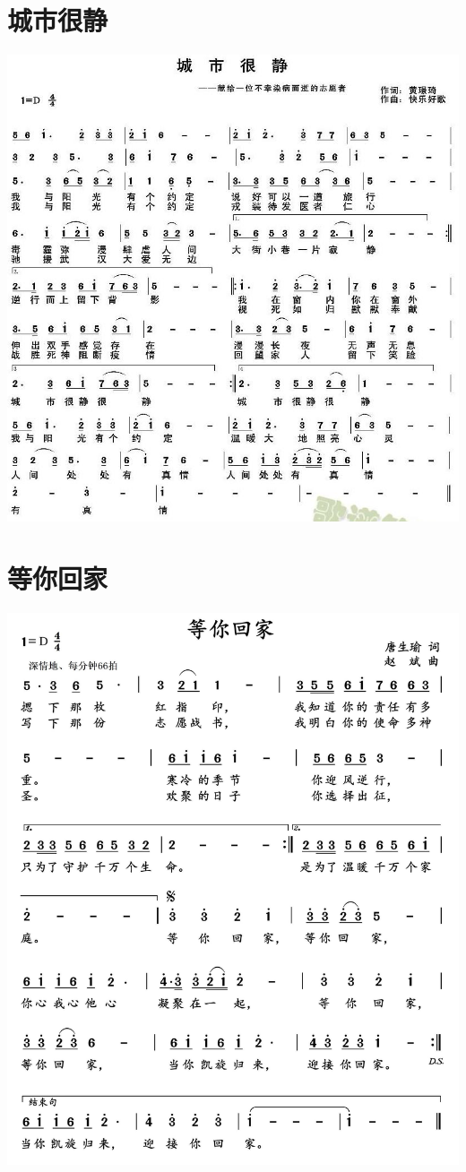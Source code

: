\documentclass[cn,pad,chinese,chinesefont=nofont]{elegantbook}
\begin{document}
\section{城市很静}
    \includegraphics[width=\textwidth]{dongxiao/20200402-城市很静} 
\section{等你回家}
    \includegraphics[width=\textwidth]{dongxiao/20200402-等你回家}
    
\end{document}
